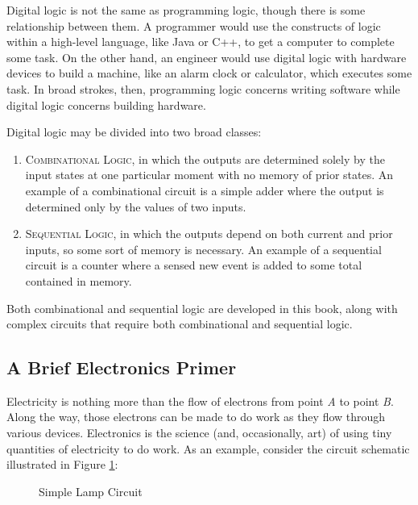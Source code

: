 Digital logic is not the same as programming logic, though there is some relationship between them. A programmer would use the constructs of logic within a high-level language, like Java or C++, to get a computer to complete some task. On the other hand, an engineer would use digital logic with hardware devices to build a machine, like an alarm clock or calculator, which executes some task. In broad strokes, then, programming logic concerns writing software while digital logic concerns building hardware. 

Digital logic may be divided into two broad classes: 

\begin{enumerate}

  \item \textsc{Combinational Logic}, in which the outputs are determined solely by the input states at one particular moment with no memory of prior states. An example of a combinational circuit is a simple adder where the output is determined only by the values of two inputs.

  \item \textsc{Sequential Logic}, in which the outputs depend on both current and prior inputs, so some sort of memory is necessary. An example of a sequential circuit is a counter where a sensed new event is added to some total contained in memory.

\end{enumerate}

Both combinational and sequential logic are developed in this book, along with complex circuits that require both combinational and sequential logic.

\subsection{A Brief Electronics Primer}

Electricity is nothing more than the flow of electrons from point \emph{A} to point \emph{B}. Along the way, those electrons can be made to do work as they flow through various devices. Electronics is the science (and, occasionally, art) of using tiny quantities of electricity to do work. As an example, consider the circuit schematic illustrated in Figure \ref{IN:fig:simple_lamp_circuit}:

\begin{figure}[htb]
  \myfloatalign
  \caption{Simple Lamp Circuit}
  \label{IN:fig:simple_lamp_circuit}
\end{figure}

